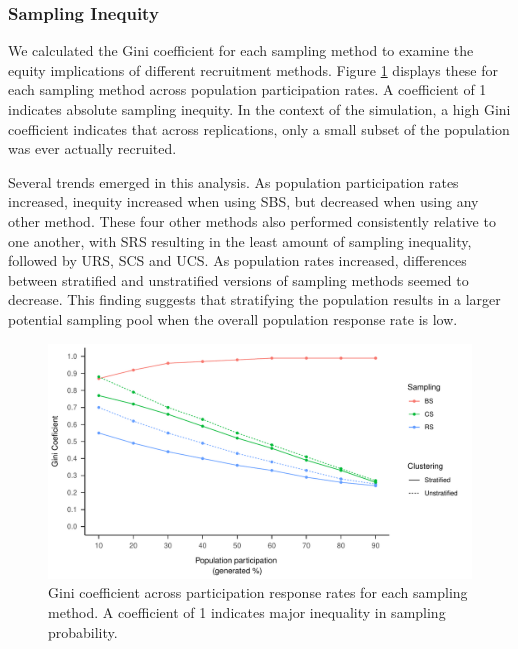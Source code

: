 \documentclass[
  english,
  man,floatsintext]{apa6}
\begin{document}
\hypertarget{sampling-inequity-1}{%
\subsubsection{Sampling Inequity}\label{sampling-inequity-1}}

We calculated the Gini coefficient for each sampling method to examine the equity implications of different recruitment methods. Figure \ref{fig:fig-gini} displays these for each sampling method across population participation rates. A coefficient of 1 indicates absolute sampling inequity. In the context of the simulation, a high Gini coefficient indicates that across replications, only a small subset of the population was ever actually recruited.

Several trends emerged in this analysis. As population participation rates increased, inequity increased when using SBS, but decreased when using any other method. These four other methods also performed consistently relative to one another, with SRS resulting in the least amount of sampling inequality, followed by URS, SCS and UCS. As population rates increased, differences between stratified and unstratified versions of sampling methods seemed to decrease. This finding suggests that stratifying the population results in a larger potential sampling pool when the overall population response rate is low.



\begin{figure}
\centering
\includegraphics{6---Paper_files/figure-latex/fig-gini-1.pdf}
\caption{\label{fig:fig-gini}Gini coefficient across participation response rates for each sampling method. A coefficient of 1 indicates major inequality in sampling probability.}
\end{figure}
\end{document}
